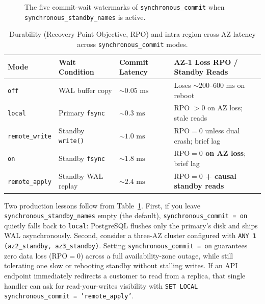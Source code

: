 \begin{figure}[H]
\caption{The five commit-wait watermarks of \texttt{synchronous\_commit} when \texttt{synchronous\_standby\_names} is active.}
\label{ch08:fig-replication-ladder}
\end{figure}

\begin{table}[H]
\centering
\small
\begin{tabular}{@{}llll@{}}
\toprule
\textbf{Mode} & \textbf{Wait Condition} & \textbf{Commit Latency} & \textbf{AZ-1 Loss RPO / Standby Reads} \\
\midrule
\texttt{off}          & WAL buffer copy       & $\sim 0.05\text{ ms}$ & Loses $\sim 200$--$600\text{ ms}$ on reboot \\
\texttt{local}        & Primary \texttt{fsync}& $\sim 0.3\text{ ms}$  & RPO $> 0$ on AZ loss; stale reads \\
\texttt{remote\_write}& Standby \texttt{write()}& $\sim 1.0\text{ ms}$& $\text{RPO}=0$ unless dual crash; brief lag \\
\texttt{on}           & Standby \texttt{fsync}& $\sim 1.8\text{ ms}$  & \textbf{$\text{RPO}=0$ on AZ loss}; brief lag \\
\texttt{remote\_apply}& Standby WAL replay    & $\sim 2.4\text{ ms}$  & \textbf{$\text{RPO}=0$ + causal standby reads} \\
\bottomrule
\end{tabular}
\caption{Durability (Recovery Point Objective, RPO) and intra-region cross-AZ latency across \texttt{synchronous\_commit} modes.}
\label{ch08:tab-sync-commit}
\end{table}

Two production lessons follow from Table~\ref{ch08:tab-sync-commit}. First, if you
leave \texttt{synchronous\_standby\_names} empty (the default),
\texttt{synchronous\_commit = on} quietly falls back to \texttt{local}: PostgreSQL
flushes only the primary's disk and ships WAL asynchronously. Second, consider a
three-AZ cluster configured with \texttt{ANY 1 (az2\_standby, az3\_standby)}.
Setting \texttt{synchronous\_commit = on} guarantees zero data loss
($\text{RPO} = 0$) across a full availability-zone outage, while still tolerating
one slow or rebooting standby without stalling writes. If an API endpoint
immediately redirects a customer to read from a replica, that single handler can
ask for read-your-writes visibility with \texttt{SET LOCAL synchronous\_commit =
'remote\_apply'}.

